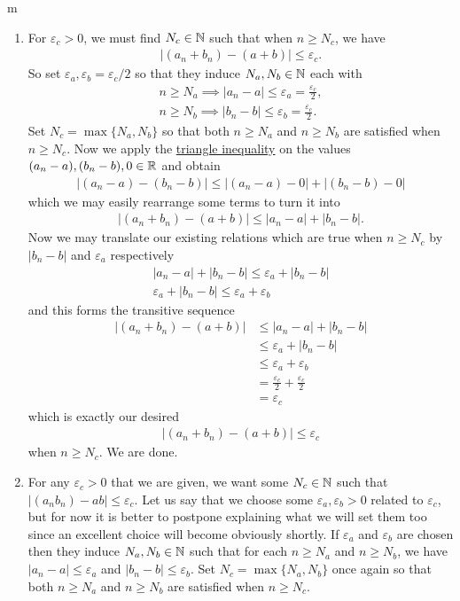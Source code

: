 \documentclass[11pt]{article}
\begin{document}
\begin{my proof}{m}
\begin{enumerate}
\item For $\varepsilon_c > 0$, we must find $N_c \in \mathbb{N}$ such that when $n \ge N_c$, we have \begin{gather*}
|(a_n + b_n) - (a + b)| \le \varepsilon_c.
\end{gather*}
So set $\varepsilon_a, \varepsilon_b = \varepsilon_c/2$ so that they induce $N_a,N_b \in \mathbb{N}$ each with \begin{gather*}
n \ge N_a \implies |a_n - a| \le \varepsilon_a = \frac{\varepsilon_c}{2}, \\
n \ge N_b \implies |b_n - b| \le \varepsilon_b = \frac{\varepsilon_c}{2}.
\end{gather*}
Set $N_c = \max\{N_a,N_b\}$ so that both $n \ge N_a$ and $n \ge N_b$ are satisfied when $n \ge N_c$. Now we apply the \hyperref[thm:RTriangleInequality]{triangle inequality} on the values $(a_n -a),(b_n - b), 0 \in \mathbb{R}$ and obtain \begin{gather*}
|(a_n - a) - (b_n - b)| \le |(a_n - a) - 0 | + |(b_n - b) - 0|
\end{gather*}
which we may easily rearrange some terms to turn it into \begin{gather*}
|(a_n + b_n) - (a + b)| \le |a_n - a| + |b_n - b|.
\end{gather*}
Now we may translate our existing relations which are true when $n \ge N_c$ by $|b_n - b|$ and $\varepsilon_a$ respectively \begin{gather*}
|a_n - a| + |b_n - b| \le \varepsilon_a + |b_n - b| \\
\varepsilon_a + |b_n - b| \le \varepsilon_a + \varepsilon_b
\end{gather*}
and this forms the transitive sequence \begin{align*}
|(a_n + b_n) - (a + b)| &\le |a_n - a| + |b_n - b| \\
&\le \varepsilon_a + |b_n - b| \\
&\le \varepsilon_a + \varepsilon_b \\
&= \frac{\varepsilon_c}{2} + \frac{\varepsilon_c}{2} \\
&= \varepsilon_c
\end{align*}
which is exactly our desired \begin{gather*}
|(a_n + b_n) - (a + b)| \le \varepsilon_c
\end{gather*}
when $n \ge N_c$. We are done.

\item For any $\varepsilon_c > 0$ that we are given, we want some $N_c \in \mathbb{N}$ such that $|(a_n b_n) - a b| \le \varepsilon_c$. Let us say that we choose some $\varepsilon_a, \varepsilon_b > 0$ related to $\varepsilon_c$, but for now it is better to postpone explaining what we will set them too since an excellent choice will become obviously shortly. If $\varepsilon_a$ and $\varepsilon_b$ are chosen then they induce $N_a,N_b \in \mathbb{N}$ such that for each $n \ge N_a$ and $n \ge N_b$, we have $|a_n - a| \le \varepsilon_a$ and $|b_n - b| \le \varepsilon_b$. Set $N_c = \max\{N_a,N_b\}$ once again so that both $n \ge N_a$ and $n \ge N_b$ are satisfied when $n \ge N_c$.


\end{enumerate}
\end{my proof}
\end{document}
